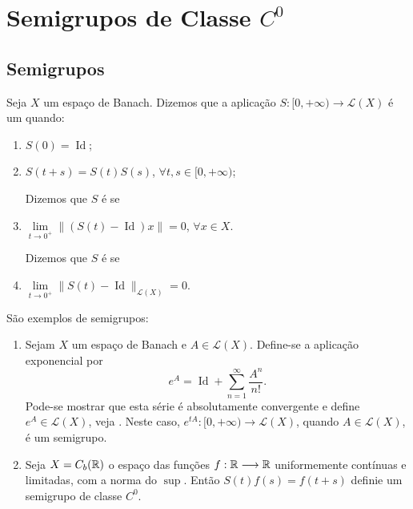 \chapter{Semigrupos de Classe $C^0$}

\section{Semigrupos}



\begin{definition}
     Seja $X$ um espaço de Banach. Dizemos que a aplicação $S:[0,+\infty)\longrightarrow \mathcal{L}(X)$ é um   quando:
\begin{enumerate}
    \item $S(0)=\operatorname{Id}$;
    \item $S(t+s)=S(t)S(s)$, $\forall t,s\in [0,+\infty)$;

Dizemos que $S$ é  se

    \item $\lim\limits_{t\to0^+} \|(S(t)-\operatorname{Id})x\|=0$, $\forall x\in X$.

Dizemos que $S$ é  se 

\item $\lim\limits_{t\to 0^+}\|S(t)-\operatorname{Id}\|_{\mathcal{L}(X)}=0$.
\end{enumerate}
\end{definition}

   \begin{example} São exemplos de semigrupos:
        \begin{enumerate}
            \item Sejam $X$ um espaço de Banach e  $A\in \mathcal{L}(X)$. Define-se a aplicação exponencial por
            \[e^{A}=\operatorname{Id}+\sum_{n=1}^\infty \frac{A^n}{n!}.\]
            Pode-se mostrar que esta série é absolutamente convergente e define $e^{A}\in \mathcal{L}(X)$, veja \cite[Apêndice 2]{gomes1985semigrupos}. Neste caso,  $e^{tA}:[0,+\infty)\to \mathcal{L}(X)$, quando $A\in \mathcal{L}(X)$, é um semigrupo.
            \item Seja $X=C_b(\mathbb{R})$  o espaço das funções $f:\mathbb{R}\longrightarrow \mathbb{R}$ uniformemente contínuas e limitadas, com a norma do $\sup$. Então $S(t)f(s)=f(t+s)$ definie um semigrupo de classe $C^0$.
        \end{enumerate}
    \end{example}


